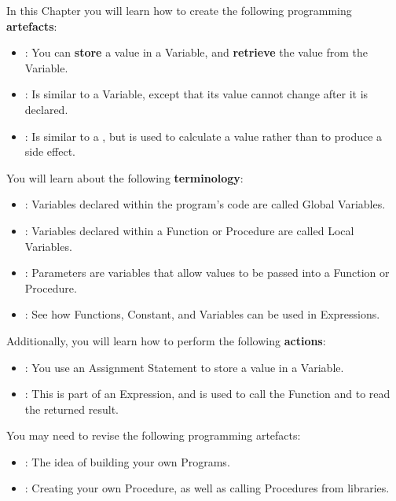 In this Chapter you will learn how to create the following programming \textbf{artefacts}:
\begin{itemize}
  \item {}: You can \textbf{store} a value in a Variable, and \textbf{retrieve} the value from the Variable.
  \item {}: Is similar to a Variable, except that its value cannot change after it is declared.
  \item {}: Is similar to a , but is used to calculate a value rather than to produce a side effect.
\end{itemize}

You will learn about the following \textbf{terminology}:
\begin{itemize}
  \item {}: Variables declared within the program's code are called Global Variables.
  \item {}: Variables declared within a Function or Procedure are called Local Variables.
  \item {}: Parameters are variables that allow values to be passed into a Function or Procedure.
  \item {}: See how Functions, Constant, and Variables can be used in Expressions.
\end{itemize}

Additionally, you will learn how to perform the following \textbf{actions}:
\begin{itemize}
  \item {}: You use an Assignment Statement to store a value in a Variable.
  \item {}: This is part of an Expression, and is used to call the Function and to read the returned result.
\end{itemize}

\bigskip

You may need to revise the following programming artefacts:
\begin{itemize}
  \item {}: The idea of building your own Programs.
  \item {}: Creating your own Procedure, as well as calling Procedures from libraries.
\end{itemize}

